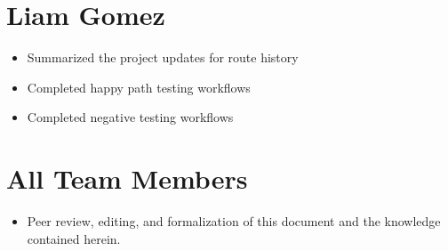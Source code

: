 \documentclass{scrreprt}
\begin{document}
	\section{Liam Gomez}
		\begin{itemize}
			\item Summarized the project updates for route history
			\item Completed happy path testing workflows
			\item Completed negative testing workflows
		\end{itemize}
	\section{All Team Members}
		\begin{itemize}
			\item Peer review, editing, and formalization of this document and the knowledge contained herein.
		\end{itemize}
\end{document}

